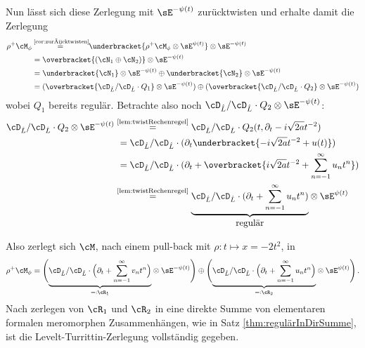 Nun lässt sich diese Zerlegung mit $\sE^{-\psi(t)}$ zurücktwisten und erhalte
damit die Zerlegung
\begin{align*}
\rho^+\cM_{\phi} &\!\!\overset{\text{ \ref{cor:zurücktwisten}}}{=}\!\!
  \underbracket{\rho^+\cM_{\phi}\otimes\sE^{\psi(t)}} \otimes\sE^{-\psi(t)}
\\&= \overbracket{(\cN_1\oplus\cN_2)}\otimes\sE^{-\psi(t)}
\\&= \underbracket{\cN_1}\otimes\sE^{-\psi(t)}
  \oplus\underbracket{\cN_2}\otimes\sE^{-\psi(t)}
\\&= (\overbracket{\cD_{\hat L}/\cD_{\hat L}\cdot Q_1}\otimes\sE^{-\psi(t)})
  \oplus(\overbracket{\cD_{\hat L}/\cD_{\hat L}\cdot Q_2}\otimes\sE^{-\psi(t)})
\end{align*}
wobei $Q_1$ bereits regulär. Betrachte also noch $\cD_{\hat L}/\cD_{\hat
L}\cdot Q_2\otimes\sE^{-\psi(t)}$:
\begin{align*}
\cD_{\hat L}/\cD_{\hat L}\cdot Q_2\otimes\sE^{-\psi(t)}
  ~&\!\!\overset{\text{\ref{lem:twistRechenregel}}}{=}
  \cD_{\hat L}/\cD_{\hat L}\cdot Q_2(t,\partial_t-i\sqrt{2a}t^{-2})
\\&= \cD_{\hat L}/\cD_{\hat L}\cdot (\partial_t
  \underbracket{-i\sqrt{2a}t^{-2} + u(t)})
\\&= \cD_{\hat L}/\cD_{\hat L}\cdot (\partial_t + \overbracket{i\sqrt{2a}t^{-2}
  +\sum_{n=-1}^\infty u_nt^n})
\\&\!\!\overset{\text{\ref{lem:twistRechenregel}}}{=} \underset{\mbox{regulär}}{\underbrace{
  \cD_{\hat L}/\cD_{\hat L}\cdot (\partial_t
  + \sum_{n=-1}^\infty u_nt^n)}}\otimes\sE^{\psi(t)}
\end{align*}
\begin{comment}
Damit ist der zweite Summand also auch ein elementarer meromorpher
Zusammenhang.
\end{comment}
Also zerlegt sich $\cM$, nach einem pull-back mit $\rho:t\mapsto x=-2t^2$, in
\[
\rho^+\cM_{\phi} = \Bigg(
  \underset{=:\cR_1}{\underbrace{\cD_{\hat L}/\cD_{\hat L}\cdot \Big(\partial_t
  + \sum_{n=-1}^\infty v_nt^n\Big)}}\otimes\sE^{-\psi(t)}\Bigg)
  \oplus \Bigg(
  \underset{=:\cR_2}{\underbrace{\cD_{\hat L}/\cD_{\hat L}\cdot \Big(\partial_t
  + \sum_{n=-1}^\infty u_nt^n\Big)}}\otimes\sE^{\psi(t)}\Bigg) \,.
\]
Nach zerlegen von $\cR_1$ und $\cR_2$ in eine direkte Summe von elementaren
formalen meromorphen Zusammenhängen, wie in Satz \ref{thm:regulärInDirSumme},
ist die Levelt-Turrittin-Zerlegung vollständig gegeben.

